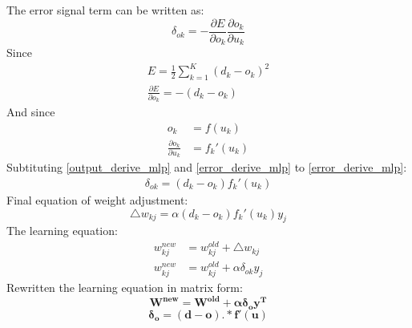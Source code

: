 The error signal term can be written as:
\begin{equation}
\delta_{ok}=-\frac{\partial E}{\partial o_k}\frac{\partial o_k}{\partial u_k}
\label{signal_term_chain_rule}
\end{equation}
Since
\begin{equation}
\begin{split}
E = \frac{1}{2} \sum_{k=1}^{K} (d_k - o_k)^{2} \\
\frac{\partial E}{\partial o_k} = - (d_k - o_k)
\end{split}
\label{error_derive_mlp}
\end{equation}
And since
\begin{equation}
\begin{split}
o_k &= f(u_k) \\
\frac{\partial o_k}{\partial u_k} &= f_{k}'(u_k)
\end{split}
\label{output_derive_mlp}
\end{equation}
Subtituting \ref{output_derive_mlp} and \ref{error_derive_mlp} to \ref{error_derive_mlp}:
\begin{equation}
\begin{split}
\delta_{ok} = (d_k -o_k)f_{k}'(u_k)
\end{split}
\label{signal_term_2}
\end{equation}
Final equation of weight adjustment:
$$\triangle w_{kj} = \alpha (d_k - o_k)f_{k}'(u_k) y_j$$
The learning equation:
\begin{equation*}
\begin{split}
w_{kj}^{new} &= w_{kj}^{old} + \triangle w_{kj} \\
w_{kj}^{new} &= w_{kj}^{old} + \alpha \delta_{ok} y_j
\end{split}
\end{equation*}
Rewritten the learning equation in matrix form:
$$\mathbf{W^{new} = W^{old} + \alpha \delta_o y^{T}}$$
$$\mathbf{\delta_o = (d-o) .* f'(u)}$$

